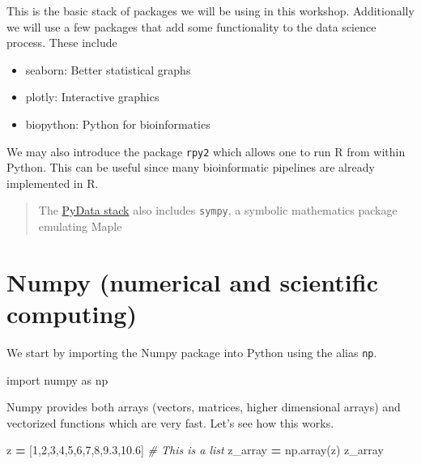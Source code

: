 \documentclass[
  letterpaper,
]{scrbook}
\newenvironment{Shaded}{\begin{snugshade}}{\end{snugshade}}
\newcommand{\CommentTok}[1]{\textcolor[rgb]{0.56,0.35,0.01}{\textit{#1}}}
\newcommand{\DecValTok}[1]{\textcolor[rgb]{0.00,0.00,0.81}{#1}}
\newcommand{\FloatTok}[1]{\textcolor[rgb]{0.00,0.00,0.81}{#1}}
\newcommand{\ImportTok}[1]{#1}
\newcommand{\NormalTok}[1]{#1}
\newcommand{\OperatorTok}[1]{\textcolor[rgb]{0.81,0.36,0.00}{\textbf{#1}}}
\begin{document}
This is the basic stack of packages we will be using in this workshop. Additionally we will use a few packages that add some functionality to the data science process. These include

\begin{itemize}
\item
  seaborn: Better statistical graphs
\item
  plotly: Interactive graphics
\item
  biopython: Python for bioinformatics
\end{itemize}

We may also introduce the package \texttt{rpy2} which allows one to run R from within Python. This can be useful since many bioinformatic pipelines are already implemented in R.

\begin{quote}
The \href{https://scipy.org}{PyData stack} also includes \texttt{sympy}, a symbolic mathematics package emulating Maple
\end{quote}

\hypertarget{numpy-numerical-and-scientific-computing}{%
\section{Numpy (numerical and scientific computing)}\label{numpy-numerical-and-scientific-computing}}

We start by importing the Numpy package into Python using the alias \texttt{np}.

\begin{Shaded}
\begin{Highlighting}[]
\ImportTok{import}\NormalTok{ numpy }\ImportTok{as}\NormalTok{ np}
\end{Highlighting}
\end{Shaded}

Numpy provides both arrays (vectors, matrices, higher dimensional arrays) and vectorized functions which are very fast. Let's see how this works.

\begin{Shaded}
\begin{Highlighting}[]
\NormalTok{z }\OperatorTok{=}\NormalTok{ [}\DecValTok{1}\NormalTok{,}\DecValTok{2}\NormalTok{,}\DecValTok{3}\NormalTok{,}\DecValTok{4}\NormalTok{,}\DecValTok{5}\NormalTok{,}\DecValTok{6}\NormalTok{,}\DecValTok{7}\NormalTok{,}\DecValTok{8}\NormalTok{,}\FloatTok{9.3}\NormalTok{,}\FloatTok{10.6}\NormalTok{] }\CommentTok{\# This is a list}
\NormalTok{z\_array }\OperatorTok{=}\NormalTok{ np.array(z)}
\NormalTok{z\_array}
\end{Highlighting}
\end{Shaded}
\end{document}
